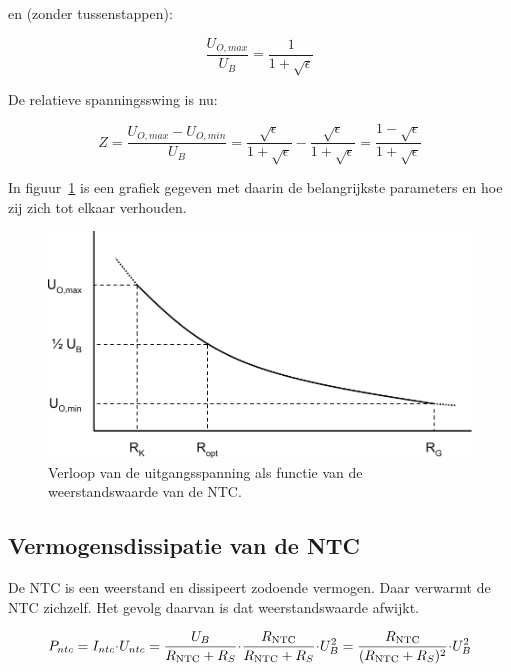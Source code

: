 \documentclass[12pt,a4paper,final,twoside,fleqn]{article}
\newcommand{\rntc}{R_\text{NTC}}
\let\oldcdot\cdot
\renewcommand{\cdot}{\kern-.10em\oldcdot\kern-.10em}
\begin{document}
en (zonder tussenstappen):

\begin{equation}
\dfrac{U_{O,max}}{U_B} = \dfrac{1}{1+\sqrt{\epsilon}}
\end{equation}

De relatieve spanningsswing is nu:

\begin{equation}
\label{equ:resspanswing}
Z =
\dfrac{U_{O,max}-U_{O,min}}{U_B} =
\dfrac{\sqrt{\epsilon}}{1+\sqrt{\epsilon}} - \dfrac{\sqrt{\epsilon}}{1+\sqrt{\epsilon}} =
\dfrac{1 - \sqrt{\epsilon}}{1+\sqrt{\epsilon}}
\end{equation}

In figuur~\ref{fig:ntc_graph1} is een grafiek gegeven met daarin de belangrijkste
parameters en hoe zij zich tot elkaar verhouden.

\begin{figure}[ht!]
\centering
\includegraphics[scale=0.63]{drawings/ntc_graph1}
\caption{Verloop van de uitgangsspanning als functie van de weerstandswaarde van de NTC.}
\label{fig:ntc_graph1}
\end{figure}

\subsection{Vermogensdissipatie van de NTC}
De NTC is een weerstand en dissipeert zodoende vermogen. Daar verwarmt de NTC
zichzelf. Het gevolg daarvan is dat weerstandswaarde afwijkt.

\begin{equation}
P_{ntc} = I_{ntc}\cdot U_{ntc} = \dfrac{U_B}{\rntc+R_S}\cdot \dfrac{\rntc}{\rntc+R_S}\cdot U_B^2 =
\dfrac{\rntc}{(\rntc+R_S)^2}\cdot U_B^2
\end{equation} 
\end{document}
